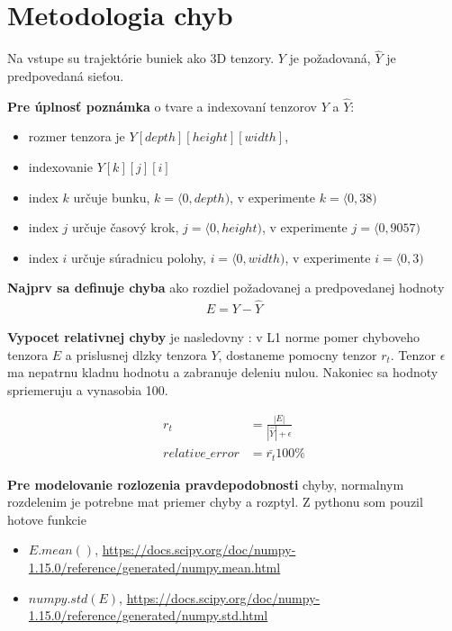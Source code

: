 \documentclass[10pt,a4paper]{article}
\begin{document}
\section{Metodologia chyb}

Na vstupe su trajektórie buniek ako 3D tenzory. $Y$ je požadovaná, $\hat{Y}$ je predpovedaná sieťou.

{\bf Pre úplnosť poznámka} o tvare a indexovaní tenzorov $Y$ a $\hat{Y}$:
\begin{itemize}
    \item rozmer tenzora je $Y[depth][height][width]$,
    \item indexovanie $Y[k][j][i]$
    \item index $k$ určuje bunku, $k = \langle 0, depth)$, v experimente  $k = \langle 0, 38)$
    \item index $j$ určuje časový krok, $j = \langle 0, height)$, v experimente  $j = \langle 0, 9057)$
    \item index $i$ určuje súradnicu polohy, $i = \langle 0, width)$, v experimente  $i = \langle 0, 3)$
\end{itemize}

{\bf Najprv sa definuje chyba} ako rozdiel požadovanej a predpovedanej hodnoty
\begin{align}
E = Y - \hat{Y}
\end{align}

{\bf Vypocet relativnej chyby} je nasledovny : v L1 norme pomer chyboveho tenzora $E$ a prislusnej dlzky tenzora $Y$,
dostaneme pomocny tenzor $r_t$. Tenzor $\epsilon$ ma nepatrnu kladnu hodnotu a zabranuje deleniu nulou.
Nakoniec sa hodnoty spriemeruju a vynasobia 100.

\begin{align}
r_t &= \frac{|E|}{|\hat{Y}| + \epsilon} \\
relative\_error &= \bar{r_t} 100\%
\end{align}

{\bf Pre modelovanie rozlozenia pravdepodobnosti} chyby, normalnym rozdelenim je potrebne mat priemer chyby
a rozptyl. Z pythonu som pouzil hotove funkcie

\begin{itemize}
    \item $E.mean()$, \url{https://docs.scipy.org/doc/numpy-1.15.0/reference/generated/numpy.mean.html}
    \item $numpy.std(E)$, \url{https://docs.scipy.org/doc/numpy-1.15.0/reference/generated/numpy.std.html}
\end{itemize}
\end{document}
